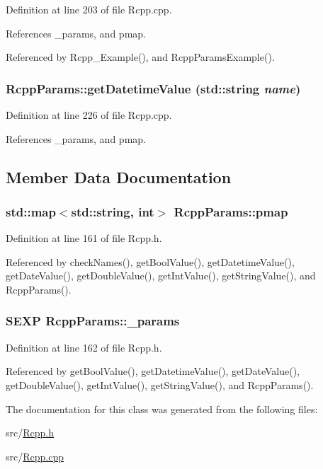 Definition at line 203 of file Rcpp.cpp.

References \_\-params, and pmap.

Referenced by Rcpp\_\-Example(), and RcppParamsExample().\hypertarget{classRcppParams_a4bec8bfe32d5079e64dc1c9a8fcf1b9}{
\subsubsection[getDatetimeValue]{ RcppParams::getDatetimeValue (std::string {\em name})}}
\label{classRcppParams_a4bec8bfe32d5079e64dc1c9a8fcf1b9}




Definition at line 226 of file Rcpp.cpp.

References \_\-params, and pmap.

\subsection{Member Data Documentation}
\hypertarget{classRcppParams_399697fc90ba3136c61dd6e20931bd8b}{
\subsubsection[pmap]{\setlength{\rightskip}{0pt plus 5cm}std::map$<$std::string, int$>$ {\bf RcppParams::pmap}}}
\label{classRcppParams_399697fc90ba3136c61dd6e20931bd8b}




Definition at line 161 of file Rcpp.h.

Referenced by checkNames(), getBoolValue(), getDatetimeValue(), getDateValue(), getDoubleValue(), getIntValue(), getStringValue(), and RcppParams().\hypertarget{classRcppParams_3040dda3b32eff66fb73d3ba3874ca5b}{
\subsubsection[\_\-params]{\setlength{\rightskip}{0pt plus 5cm}SEXP {\bf RcppParams::\_\-params}}}
\label{classRcppParams_3040dda3b32eff66fb73d3ba3874ca5b}




Definition at line 162 of file Rcpp.h.

Referenced by getBoolValue(), getDatetimeValue(), getDateValue(), getDoubleValue(), getIntValue(), getStringValue(), and RcppParams().

The documentation for this class was generated from the following files:\begin{CompactItemize}
\item 
src/\hyperlink{Rcpp_8h}{Rcpp.h}\item 
src/\hyperlink{Rcpp_8cpp}{Rcpp.cpp}\end{CompactItemize}
